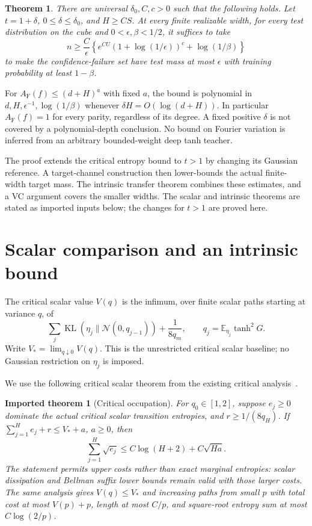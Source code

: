 \documentclass[11pt]{article}
\newtheorem{theorem}{Theorem}
\newtheorem{inputlemma}{Imported theorem}
\newcommand{\E}{\mathbb E}
\newcommand{\KL}{\operatorname{KL}}
\newcommand{\AF}{A_{\mathrm F}}
\begin{document}
\begin{theorem}\label{thm:main}
There are universal $\delta_0,C,c>0$ such that the following holds.
Let $t=1+\delta$, $0\le\delta\le\delta_0$, and $H\ge CS$.
At every finite realizable width, for every test distribution on the
cube and $0<\epsilon,\beta<1/2$, it suffices to take
\begin{equation}\label{eq:samples}
 n\ge\frac C\epsilon\left\{
 e^{CU}(1+\log(1/\epsilon))^c+\log(1/\beta)\right\}
\end{equation}
to make the confidence-failure set have test mass at most $\epsilon$
with training probability at least $1-\beta$.
\end{theorem}
For $\AF(f)\le(d+H)^a$ with fixed $a$, the bound is polynomial in
$d,H,\epsilon^{-1},\log(1/\beta)$ whenever
$\delta H=O(\log(d+H))$. In particular $\AF(f)=1$ for every parity,
regardless of its degree. A fixed positive $\delta$ is not covered by a
polynomial-depth conclusion. No bound on Fourier variation is inferred
from an arbitrary bounded-weight deep tanh teacher.

The proof extends the critical entropy bound to $t>1$ by changing its
Gaussian reference. A target-channel construction then lower-bounds the
actual finite-width target mass. The intrinsic transfer theorem combines
these estimates, and a VC argument covers the smaller widths. The scalar
and intrinsic theorems are stated as imported inputs below; the changes
for $t>1$ are proved here.

\section{Scalar comparison and an intrinsic bound}
The critical scalar value $V(q)$ is the infimum, over finite scalar
paths starting at variance $q$, of
\[
 \sum_j\KL(\eta_j\|\mathcal N(0,q_{j-1}))+\frac1{8q_m},
 \qquad q_j=\E_{\eta_j}\tanh^2 G.
\]
Write $V_* =\lim_{q\downarrow0}V(q)$. This is the unrestricted critical
scalar baseline; no Gaussian restriction on $\eta_j$ is imposed.

We use the following critical scalar theorem from the existing
critical analysis~\cite{critical}.
\begin{inputlemma}[Critical occupation]\label{inp:occupation}
For $q_0\in[1,2]$, suppose $e_j\ge0$ dominate the actual critical scalar
transition entropies, and $r\ge1/(8q_H)$. If
$\sum_{j=1}^H e_j+r\le V_*+a$, $a\ge0$, then
\[
 \sum_{j=1}^H\sqrt{e_j}\le C\log(H+2)+C\sqrt{Ha}.
\]
The statement permits upper costs rather than exact marginal
entropies: scalar dissipation and Bellman suffix lower bounds remain
valid with those larger costs. The same analysis gives
$V(q)\le V_*$ and increasing paths from small $p$ with total cost at
most $V(p)+p$, length at most $C/p$, and square-root entropy sum at most
$C\log(2/p)$.
\end{inputlemma}
\end{document}
